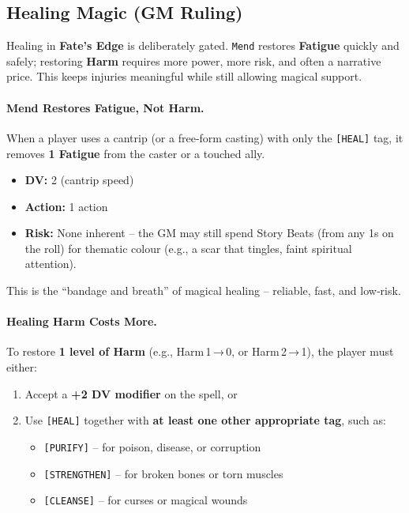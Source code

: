 \subsection*{Healing Magic (GM Ruling)}
\label{subsec:healing-magic-gm}

Healing in \textbf{Fate's Edge} is deliberately gated.  \texttt{Mend} restores \textbf{Fatigue} quickly and safely; restoring \textbf{Harm} requires more power, more risk, and often a narrative price.  This keeps injuries meaningful while still allowing magical support.

\paragraph{Mend Restores Fatigue, Not Harm.}
When a player uses a cantrip (or a free‑form casting) with only the \texttt{[HEAL]} tag, it removes \textbf{1 Fatigue} from the caster or a touched ally.  
\begin{itemize}
  \item \textbf{DV:} 2 (cantrip speed)  
  \item \textbf{Action:} 1 action  
  \item \textbf{Risk:} None inherent – the GM may still spend Story Beats (from any 1s on the roll) for thematic colour (e.g., a scar that tingles, faint spiritual attention).
\end{itemize}
This is the “bandage and breath” of magical healing – reliable, fast, and low‑risk.

\paragraph{Healing Harm Costs More.}
To restore \textbf{1 level of Harm} (e.g., Harm 1 → 0, or Harm 2 → 1), the player must either:

\begin{enumerate}
  \item Accept a \textbf{+2 DV modifier} on the spell, or
  \item Use \texttt{[HEAL]} together with \textbf{at least one other appropriate tag}, such as:
    \begin{itemize}
      \item \texttt{[PURIFY]} – for poison, disease, or corruption
      \item \texttt{[STRENGTHEN]} – for broken bones or torn muscles
      \item \texttt{[CLEANSE]} – for curses or magical wounds
    \end{itemize}
\end{enumerate}

